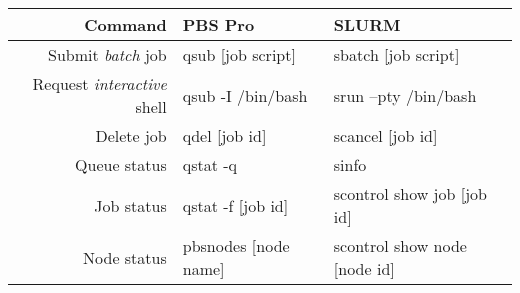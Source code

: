 \small
{\renewcommand{\arraystretch}{1.2}%
\begin{tabularx}{\textwidth}{r|X|X}
\toprule
{\bf Command} & {\bf PBS Pro} & {\bf SLURM}  \\
\midrule

Submit {\em batch} job &
qsub [job script] &
sbatch [job script]
\\ \hline

Request {\em interactive} shell &
qsub -I /bin/bash &
srun --pty /bin/bash
\\ \hline

Delete job &
qdel [job id] &
scancel [job id]
\\ \hline

Queue status &
qstat -q &
sinfo
\\ \hline

Job status &
qstat -f [job id]  &
scontrol show job [job id]
\\ \hline

Node status &
pbsnodes [node name] &
scontrol show node [node id]
\\ \hline

\bottomrule
\end{tabularx}}



